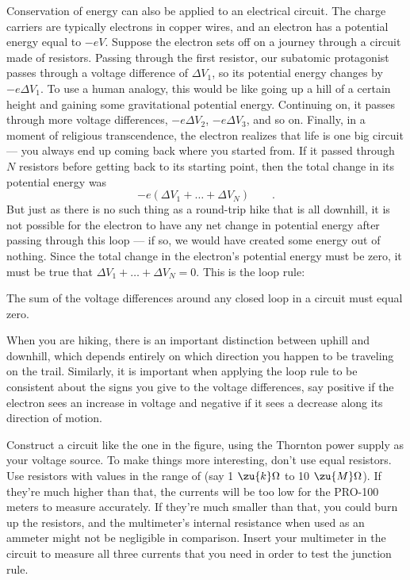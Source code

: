 Conservation of energy can also be applied to an electrical
circuit. The charge carriers are typically electrons in
copper wires, and an electron has a potential energy equal
to $-eV$. Suppose the electron sets off on a journey through a
circuit made of resistors. Passing through the first
resistor, our subatomic protagonist passes through a voltage
difference of $\Delta V_1$, so its potential 
energy changes by $-e\Delta V_1$. To use
a human analogy, this would be like going up a hill of a
certain height and gaining some gravitational potential
energy. Continuing on, it passes through more voltage
differences, $-e\Delta V_2$, $-e\Delta V_3$, and so on. Finally, in a moment of
religious transcendence, the electron realizes that life is
one big circuit --- you always end up coming back where you
started from. If it passed through $N$ resistors before
getting back to its starting point, then the total change in
its potential energy was 
\begin{equation*}
	-e\left(\Delta V_1+\ldots+\Delta V_N\right) \qquad .
\end{equation*}
But just as there is no such
thing as a round-trip hike that is all downhill, it is not
possible for the electron to have any net change in
potential energy after passing through this loop --- if so,
we would have created some energy out of nothing. Since the
total change in the electron's potential energy must be
zero, it must be true that $\Delta V_1+\ldots+\Delta V_N=0$.
This is the loop rule:

The sum of the voltage differences around any closed loop
in a circuit must equal zero.

When you are hiking, there is an important distinction
between uphill and downhill, which depends entirely on which
direction you happen to be traveling on the trail.
Similarly, it is important when applying the loop rule to be
consistent about the signs you give to the voltage
differences, say positive if the electron sees an increase
in voltage and negative if it sees a decrease along its
direction of motion.

\observations


Construct a circuit like the one in the figure, using the Thornton power
supply as your voltage source. To make things more
interesting, don't use equal resistors. Use 
resistors with values in the range of (say 1 $\zu{k}\Omega$ to 10 $\zu{M}\Omega$).
If they're much higher than that, the currents will be too low for the PRO-100
meters to measure accurately.
If they're much smaller than that, 
you could burn up the resistors, and the
multimeter's internal resistance when used as an
ammeter might not be negligible in comparison. Insert your multimeter
in the circuit to measure all three currents that you need
in order to test the junction rule.


